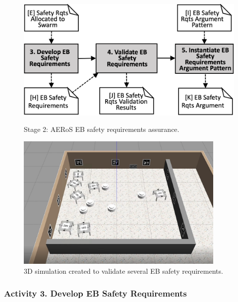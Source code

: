 \documentclass[runningheads]{llncs}
\begin{document}
\begin{figure}
	\vspace{-4ex}
	\centering
	\begin{minipage}{.55\textwidth}
		\centering
		\includegraphics[trim={0mm -6mm 0mm -6mm},clip,width=\textwidth]{figures/amlas-a-stage2-v3.png}
		\vspace{-2ex}
		\caption{Stage 2: AERoS EB safety requirements assurance.}%
	\label{amlas-a-stage2}
\end{minipage}%
\begin{minipage}{.45\textwidth}
	\centering
	\includegraphics[trim={30mm 25mm 45mm 30mm},clip,width=0.9\textwidth]{figures/3Dsim.png}
	\vspace{-2ex}
	\caption{3D simulation created to validate several EB safety requirements.}
	\label{3Dsim}
\end{minipage}
\vspace{-4ex}
\end{figure}

\vspace{-2ex}
\subsubsection*{Activity 3. Develop EB Safety Requirements}
\end{document}
